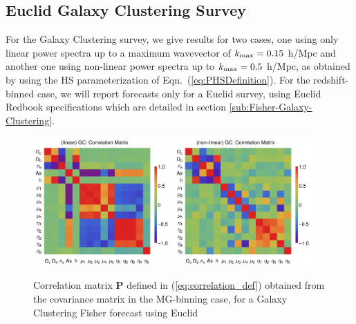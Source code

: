 \subsection{\label{sub:GC-Correlations}Euclid Galaxy Clustering Survey}


For the Galaxy Clustering survey, we give results for two cases, one
using only linear power spectra up to a maximum wavevector of $k_{\rm max}=0.15$
h/Mpc and another one using non-linear power spectra up to $k_{\rm max}=0.5$
h/Mpc, as obtained by using the HS parameterization of
Eqn.\ (\ref{eq:PHSDefinition}).
For the redshift-binned case, we will report forecasts only for a Euclid survey, 
using Euclid Redbook specifications which
are detailed in section \ref{sub:Fisher-Galaxy-Clustering}.

\begin{figure}[H]
\centering
\includegraphics[width=0.47\textwidth]{Chapters/linear-nonlinear-MG-forecasts/figures/Decorrelations-GC/correlation-full-fiducialMGBin3-Euclid-GC-linearPK-}
\includegraphics[width=0.47\textwidth]{Chapters/linear-nonlinear-MG-forecasts/figures/Decorrelations-GC/correlation-full-fiducialMGBin3-Euclid-GC-nonlinearPk__Zhao-}
\caption[Correlation matrices for a Euclid Galaxy Clustering forecast.]{\label{fig:GCcorr}
Correlation matrix $\mathbf P$ defined in (\ref{eq:correlation_def}) obtained from the covariance matrix in the MG-binning case, for a Galaxy Clustering Fisher forecast using Euclid
}
\end{figure}
